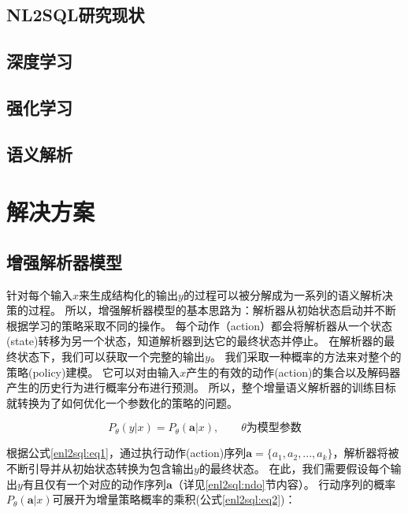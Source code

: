 \subsection{NL2SQL研究现状}
\subsection{深度学习}
\subsection{强化学习}
\subsection{语义解析}
\section{解决方案}

\subsection{增强解析器模型}
\label{enl2sql:zqjxqmx}
针对每个输入$x$来生成结构化的输出$y$的过程可以被分解成为一系列的语义解析决策的过程。
所以，增强解析器模型的基本思路为：解析器从初始状态启动并不断根据学习的策略采取不同的操作。
每个动作（action）都会将解析器从一个状态(state)转移为另一个状态，知道解析器到达它的最终状态并停止。
在解析器的最终状态下，我们可以获取一个完整的输出$y$。
我们采取一种概率的方法来对整个的策略(policy)建模。
它可以对由输入$x$产生的有效的动作(action)的集合以及解码器产生的历史行为进行概率分布进行预测。
所以，整个增量语义解析器的训练目标就转换为了如何优化一个参数化的策略的问题。

\begin{equation}
    \label{enl2sql:eq1}
    P_{\theta}(y|x) = P_{\theta}(\boldsymbol{a}|x),  \qquad \theta\text{为模型参数}
\end{equation}

根据公式\ref{enl2sql:eq1}，通过执行动作(action)序列$\boldsymbol{a} = \{a_{1},a_{2},...,a_{k}\}$，解析器将被不断引导并从初始状态转换为包含输出$y$的最终状态。
在此，我们需要假设每个输出$y$有且仅有一个对应的动作序列$\boldsymbol{a}$（详见\ref{enl2sql:ndo}节内容）。
行动序列的概率$P_{\theta}(\boldsymbol{a}|x)$可展开为增量策略概率的乘积(公式\ref{enl2sql:eq2})：

